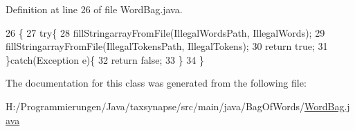 Definition at line 26 of file Word\-Bag.\-java.


\begin{DoxyCode}
26                                                                               \{
27         \textcolor{keywordflow}{try}\{
28             fillStringarrayFromFile(IllegalWordsPath, IllegalWords);
29             fillStringarrayFromFile(IllegalTokensPath, IllegalTokens);
30             \textcolor{keywordflow}{return} \textcolor{keyword}{true};
31         \}\textcolor{keywordflow}{catch}(Exception e)\{
32             \textcolor{keywordflow}{return} \textcolor{keyword}{false};
33         \}
34     \}
\end{DoxyCode}


The documentation for this class was generated from the following file\-:\begin{DoxyCompactItemize}
\item 
H\-:/\-Programmierungen/\-Java/taxsynapse/src/main/java/\-Bag\-Of\-Words/\hyperlink{_word_bag_8java}{Word\-Bag.\-java}\end{DoxyCompactItemize}
